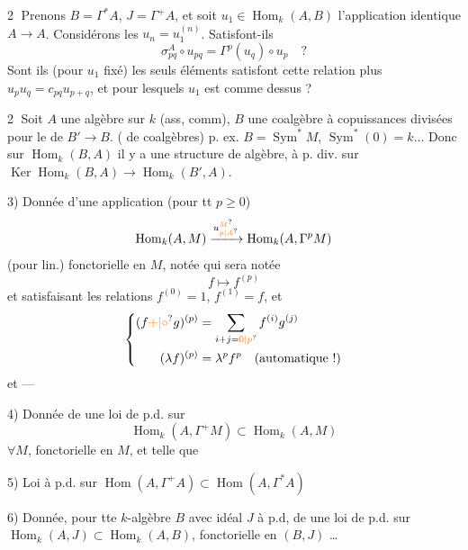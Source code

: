 \textcircled{2} Prenons $B=\Gamma^{\ast}A$, $J=\Gamma^{+}A$, et
soit $u_1\in\operatorname{Hom}_k(A,B)$ l'application
identique $A\longrightarrow A$. Considérons les
$u_n=u_1^{(n)}$. Satisfont-ils
\[
\sigma^{A}_{pq}\circ u_{pq}=\Gamma^p(u_q)\circ u_p\quad ?
\]
Sont ils (pour $u_1$ fixé) les seuls
éléments  satisfont cette relation
plus $u_pu_q=c_{pq}u_{p+q}$, et pour
lesquels $u_1$ est comme dessus ?

\textcircled{2} Soit $A$ une algèbre sur $k$ (ass, comm),
$B$ une coalgèbre à copuissances divisées
pour le  de $B'\longrightarrow B$. ( de
coalgèbres) p. ex. $B=\operatorname{Sym}^{\ast}M$,
 $\operatorname{Sym}^{\ast}(0)=k\ldots$ Donc sur
$\operatorname{Hom}_k(B,A)$ il y a une structure de
 algèbre, à p. div. sur
$\operatorname{Ker}\operatorname{Hom}_k(B,A)\longrightarrow\operatorname{Hom}_k(B',A)$.


3) Donnée d'une application (pour tt $p\geq 0$)
\[
\operatorname{Hom}_k(A,M)\xrightarrow{u_{\unsure{p|A}}^{\unsure{M}}}\operatorname{Hom}_k(A,\Gamma^pM)
\]
(pour lin.) fonctorielle en $M$, notée
 qui  sera notée
\[
f\longmapsto f^{(p)}
\]
et satisfaisant les relations $f^{(0)}=1$, $f^{(1)}=f$, et
\[
\left\{\begin{aligned}
(f\unsure{+|{\circ}}g)^{(p)}&=\sum_{i+j=\unsure{0|p}}f^{(i)}g^{(j)}\\
(\lambda f)^{(p)}&=\lambda^p f^p\quad\text{(automatique !)}
\end{aligned}\right.
\]
et ---

4) Donnée de une loi de p.d. sur
\[
\operatorname{Hom}_k(A,\Gamma^+M)\subset\operatorname{Hom}_k(A,M)
\]
$\forall M$, fonctorielle en $M$, et telle que

5) Loi à p.d. sur $\operatorname{Hom}(A,\Gamma^+A)\subset\operatorname{Hom}(A,\Gamma^{\ast}A)$

6) Donnée, pour tte $k$-algèbre $B$  avec
idéal $J$ à p.d, de une loi de
p.d. sur $\operatorname{Hom}_k(A,J)\subset\operatorname{Hom}_k(A,B)$,
fonctorielle en $(B,J)$ \ldots



